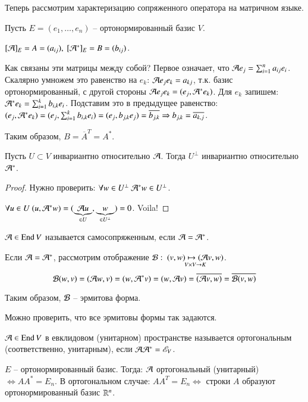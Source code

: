 \documentclass[main]{subfiles}
\begin{document}
Теперь рассмотрим характеризацию сопряженного оператора на матричном языке.

Пусть $E = (e_1, \ldots, e_n)$ -- ортонормированный базис $V$.

$[\mathcal{A}]_E = A = (a_{ij}), \ [\mathcal{A}^*]_E = B = (b_{ij})$.

Как связаны эти матрицы между собой?
Первое означает, что $\mathcal{A} e_j = \sum_{i=1}^n a_{ij} e_i$. Скалярно умножем это равенство на $e_k$:
$\mathcal{A} e_j e_k = a_{kj}$, т.к. базис ортонормированный, с другой стороны $\mathcal{A} e_j e_k = (e_j, \mathcal{A}^* e_k)$.
Для $e_k$ запишем: $\mathcal{A}^* e_k = \sum_{i=1}^k b_{i, k} e_i$. Подставим это в предыдущее равенство:
$(e_j, \mathcal{A}^* e_k) = (e_j, \sum_{i=1}^k b_{i, k} e_i) = (e_j, b_{j, k} e_j) = \overline{b_{j, k}} \Rightarrow
    b_{j, k} = \overline{a_{k, j}}$.

Таким образом, $B = \overline{A}^T = A^*$.

\begin{proposition}
    Пусть $U \subset V$ инвариантно относительно $\mathcal{A}$. Тогда $U^{\perp}$ инвариантно относительно $\mathcal{A}^*$.
\end{proposition}

\begin{proof}
    Нужно проверить: $\forall w \in U^{\perp} \ \mathcal{A}^* w \in U^{\perp}$.

    $\forall u \in U \ (u, \mathcal{A}^* w) = (\underbrace{\mathcal{A} u}_{\in U}, \underbrace{w}_{\in U^{\perp}}) = 0$. Voila!
\end{proof}

\begin{definition}
    $\mathcal{A} \in \operatorname{End} V$ называется самосопряженным, если $\mathcal{A} = \mathcal{A}^*$.
\end{definition}

Если  $\mathcal{A} = \mathcal{A}^*$, рассмотрим отображение $\mathcal{B}: \ \underset{V\times V \rightarrow K}{(v, w) \mapsto (\mathcal{A} v, w)}$.
\[\mathcal{B}(w, v) = (\mathcal{A} w, v) = (w, \mathcal{A}^* v) = (w, \mathcal{A} v) = \overline{(\mathcal{A} v, w)} = \overline{\mathcal{B}( v, w)}\]

Таким образом, $\mathcal{B}$ -- эрмитова форма.

Можно проверить, что все эрмитовы формы так задаются.

\begin{definition}
    $\mathcal{A} \in \operatorname{End} V$ в евклидовом (унитарном) пространстве называется ортогональным (соответственно, унитарным),
    если $\mathcal{A} \mathcal{A}^* = \mathscr{E}_V$.
\end{definition}

$E$ -- ортонормированный базис. Тогда: $\mathcal{A}$ ортогональный (унитарный) $\Leftrightarrow AA^* = E_n$.
В ортогональном случае: $AA^T = E_n \Leftrightarrow$ строки $A$ образуют ортонормированный базис $\mathbb{R}^n$.
\end{document}
